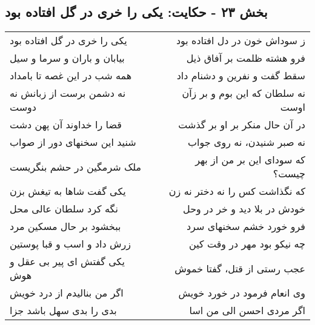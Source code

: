 \begin{center}
\section*{بخش ۲۳ - حکایت: یکی را خری در گل افتاده بود}
\label{sec:023}
\begin{longtable}{l p{0.5cm} r}
یکی را خری در گل افتاده بود
&&
ز سوداش خون در دل افتاده بود
\\
بیابان و باران و سرما و سیل
&&
فرو هشته ظلمت بر آفاق ذیل
\\
همه شب در این غصه تا بامداد
&&
سقط گفت و نفرین و دشنام داد
\\
نه دشمن برست از زبانش نه دوست
&&
نه سلطان که این بوم و بر زآن اوست
\\
قضا را خداوند آن پهن دشت
&&
در آن حال منکر بر او بر گذشت
\\
شنید این سخنهای دور از صواب
&&
نه صبر شنیدن، نه روی جواب
\\
ملک شرمگین در حشم بنگریست
&&
که سودای این بر من از بهر چیست؟
\\
یکی گفت شاها به تیغش بزن
&&
که نگذاشت کس را نه دختر نه زن
\\
نگه کرد سلطان عالی محل
&&
خودش در بلا دید و خر در وحل
\\
ببخشود بر حال مسکین مرد
&&
فرو خورد خشم سخنهای سرد
\\
زرش داد و اسب و قبا پوستین
&&
چه نیکو بود مهر در وقت کین
\\
یکی گفتش ای پیر بی عقل و هوش
&&
عجب رستی از قتل، گفتا خموش
\\
اگر من بنالیدم از درد خویش
&&
وی انعام فرمود در خورد خویش
\\
بدی را بدی سهل باشد جزا
&&
اگر مردی احسن الی من اسا
\\
\end{longtable}
\end{center}
